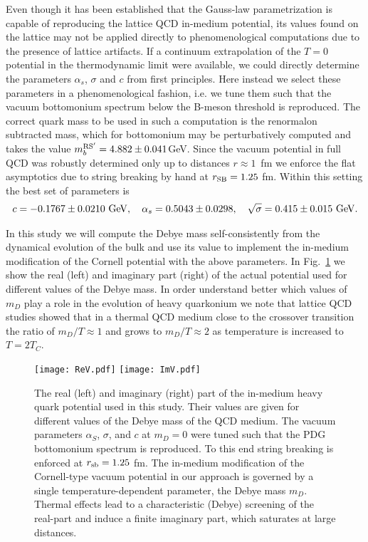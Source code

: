 Even though it has been established that the Gauss-law parametrization is capable of reproducing the lattice QCD in-medium potential, its values found on the lattice may not be applied directly to phenomenological computations due to the presence of lattice artifacts. If a continuum extrapolation of the $T=0$ potential in the thermodynamic limit were available, we could directly determine the parameters $\alpha_s$, $\sigma$ and $c$ from first principles. Here instead we select these parameters in a phenomenological fashion, i.e. we tune them such that the vacuum bottomonium spectrum below the B-meson threshold is reproduced. The correct quark mass to be used in such a computation is the renormalon subtracted mass, which for bottomonium may be perturbatively computed and takes the value $m^{\rm RS'}_b=4.882\pm0.041$GeV. Since the vacuum potential in full QCD was robustly determined only up to distances \mbox{$r\approx1$ fm} we enforce the flat asymptotics due to string breaking by hand at $r_{\rm SB}=1.25$ fm. Within this setting the best set of parameters is
\begin{align}
c=-0.1767\pm 0.0210~{\rm GeV}, \quad \alpha_s=0.5043\pm 0.0298,\quad \sqrt{\sigma}=0.415\pm0.015~{\rm GeV}.\label{T0const}
\end{align}

In this study we will compute the Debye mass self-consistently from the dynamical evolution of the bulk and use its value to implement the in-medium modification of the Cornell potential with the above parameters. In Fig.~\ref{Fig:Potential} we show the real (left) and imaginary part (right) of the actual potential used for different values of the Debye mass. In order understand better which values of $m_D$ play a role in the evolution of heavy quarkonium we note that lattice QCD studies showed that in a thermal QCD medium close to the crossover transition the ratio of $m_D/T\approx1$ and grows to $m_D/T\approx2$ as temperature is increased to $T=2T_C$.
\begin{figure*}
\texttt{[image: ReV.pdf]}
\texttt{[image: ImV.pdf]}
\caption{The real (left) and imaginary (right) part of the in-medium heavy quark potential used in this study. Their values are given for different values of the Debye mass of the QCD medium. The vacuum parameters $\alpha_S$, $\sigma$, and $c$ at $m_D=0$ were tuned such that the PDG bottomonium spectrum is reproduced. To this end string breaking is enforced at $r_{\rm sb}=1.25$ fm. The in-medium modification of the Cornell-type vacuum potential in our approach is governed by a single temperature-dependent parameter, the Debye mass $m_D$. Thermal effects lead to a characteristic (Debye) screening of the real-part and induce a finite imaginary part, which saturates at large distances.}\label{Fig:Potential}
\end{figure*}


